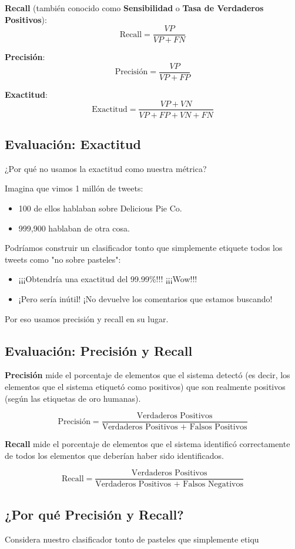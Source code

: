 \documentclass[11pt,fleqn]{book} %
\begin{document}
\textbf{Recall} (también conocido como \textbf{Sensibilidad} o \textbf{Tasa de Verdaderos Positivos}):
\[ \text{Recall} = \frac{VP}{VP + FN} \]

\textbf{Precisión}:
\[ \text{Precisión} = \frac{VP}{VP + FP} \]

\textbf{Exactitud}:
\[ \text{Exactitud} = \frac{VP + VN}{VP + FP + VN + FN} \]


\subsection{Evaluación: Exactitud}
¿Por qué no usamos la exactitud como nuestra métrica?

Imagina que vimos 1 millón de tweets:
\begin{itemize}
\item 100 de ellos hablaban sobre Delicious Pie Co.
\item 999,900 hablaban de otra cosa.
\end{itemize}

Podríamos construir un clasificador tonto que simplemente etiquete todos los tweets como "no sobre pasteles":
\begin{itemize}
\item ¡¡¡Obtendría una exactitud del 99.99\%!!! ¡¡¡Wow!!!
\item ¡Pero sería inútil! ¡No devuelve los comentarios que estamos buscando!
\end{itemize}

Por eso usamos precisión y recall en su lugar.

\subsection{Evaluación: Precisión y Recall}
\textbf{Precisión} mide el porcentaje de elementos que el sistema detectó (es decir, los elementos que el sistema etiquetó como positivos) que son realmente positivos (según las etiquetas de oro humanas).

\[
\text{Precisión} = \frac{\text{Verdaderos Positivos}}{\text{Verdaderos Positivos + Falsos Positivos}}
\]

\textbf{Recall} mide el porcentaje de elementos que el sistema identificó correctamente de todos los elementos que deberían haber sido identificados.

\[
\text{Recall} = \frac{\text{Verdaderos Positivos}}{\text{Verdaderos Positivos + Falsos Negativos}}
\]

\subsection{¿Por qué Precisión y Recall?}
Considera nuestro clasificador tonto de pasteles que simplemente etiqu
\end{document}

